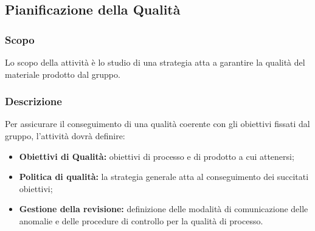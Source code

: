 \documentclass[../NormediProgetto.tex]{subfiles}
\begin{document}

\subsection{Pianificazione della Qualità}

\subsubsection{Scopo}

Lo scopo della attività è lo studio di una strategia atta a garantire la qualità del materiale prodotto dal gruppo. 

\subsubsection{Descrizione}

Per assicurare il conseguimento di una qualità coerente con gli obiettivi fissati dal gruppo, l'attività dovrà definire:

\begin{itemize}
	    
	\item \textbf{Obiettivi di Qualità:} obiettivi di processo e di prodotto a cui attenersi;
	
    \item \textbf{Politica di qualità:} la strategia generale atta al conseguimento dei succitati obiettivi;

    \item \textbf{Gestione della revisione:} definizione delle modalità di comunicazione delle anomalie e delle procedure di controllo per la qualità di processo.
\end{itemize}
\end{document}
